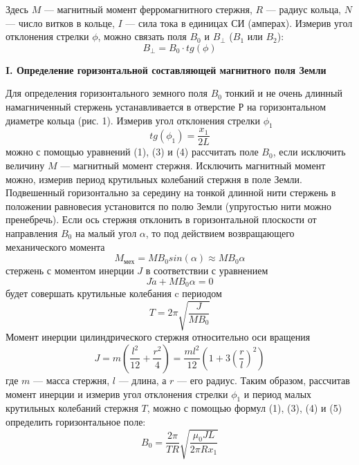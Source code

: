 \documentclass[a4paper, 12pt]{article}%
\begin{document}
	Здесь
	$M$ — магнитный момент ферромагнитного стержня,
	$R$ — радиус кольца,
	$N$ — число витков в кольце,
	$I$ — сила тока в единицах СИ (амперах).
	Измерив угол отклонения стрелки	$\phi$, можно связать поля
	$B_0$ и $B_\perp$ ($B_1$ или $B_2$):
	\begin{equation}
		B_\perp =B_0 \cdot tg(\phi)
	\end{equation}
	\begin{center}
		\textbf{I. Определение горизонтальной составляющей магнитного поля Земли}
	\end{center}
	Для определения горизонтального земного поля $B_0$ тонкий и не очень длинный намагниченный стержень
	устанавливается в отверстие Р на горизонтальном диаметре кольца (рис. 1). Измерив угол отклонения стрелки $\phi_1$
	\begin{equation}
		tg(\phi_1) = \frac{x_1}{2L}
	\end{equation}
	можно с помощью уравнений (1), (3)
	и (4) рассчитать поле $B_0$, если исключить величину $M$ — магнитный момент стержня.
	Исключить магнитный момент можно, измерив период крутильных
	колебаний стержня в поле Земли. Подвешенный горизонтально за середину на
	тонкой длинной нити стержень в положении равновесия
	установится по полю Земли (упругостью нити можно пренебречь). Если ось стержня отклонить в
	горизонтальной плоскости от направления
	$B_0$ на малый угол
	$\alpha$, то под действием возвращающего механического момента
	\begin{equation*}
		M_{мех} = M B_0 sin(\alpha) \approx M B_0 \alpha
	\end{equation*}
	стержень с моментом инерции
	$J$ в соответствии с уравнением
	\begin{equation*}
		J \ddot{a} + M B_0 \alpha = 0
	\end{equation*}
	будет совершать крутильные колебания c периодом
	\begin{equation}
		T = 2 \pi \sqrt{\frac{J}{MB_0}}
	\end{equation}
	Момент инерции цилиндрического стержня относительно оси вращения
	\begin{equation}
		J = m (\frac{l^2}{12} + \frac{r^2}{4}) = \frac{ml^2}{12}(1 + 3( \frac{r}{l})^2)
	\end{equation}
	где
	$m$
	— масса стержня, $l$ — длина,
	а $r$ — его радиус.
	Таким образом, рассчитав момент инерции
	и измерив угол отклонения
	стрелки
	$\phi_1$ и период малых крутильных
	колебаний стержня
	$T$, можно с помощью формул (1), (3), (4)
	и (5) определить горизонтальное поле:
	\begin{equation}
		B_0 = \frac{2 \pi}{TR} \sqrt{\frac{\mu_0 JL}{2\pi R x_1}}	
	\end{equation}
\end{document}
